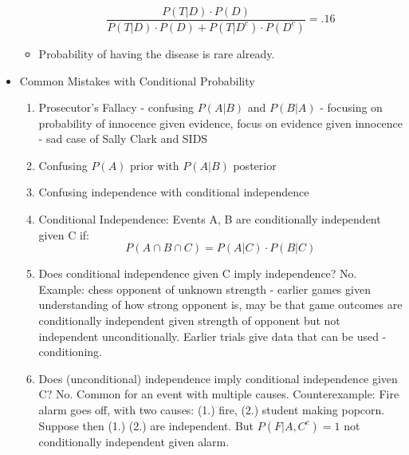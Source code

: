 \documentclass[11pt, oneside]{article}   	%
\begin{document}
\begin{itemize}
\begin{itemize}
						\[
							\frac{P(T|D) \cdot P(D)}{P(T|D) \cdot P(D) + P(T|D^{c}) \cdot P(D^{c})} = .16
						\]
					\item Probability of having the disease is rare already.
				\end{itemize}
			\item Common Mistakes with Conditional Probability
				\begin{enumerate}
					\item Prosecutor's Fallacy - confusing $P(A|B)$ and $P(B|A)$ - focusing on probability of innocence given evidence, focus on evidence given innocence - sad case of Sally Clark and SIDS
					\item Confusing $P(A)$ prior with $P(A|B)$ posterior
					\item Confusing independence with conditional independence
					\item Conditional Independence: Events A, B are conditionally independent given C if:
						\[
							P(A \cap B \cap C) = P(A|C) \cdot P(B|C)
						\]
					\item Does conditional independence given C imply independence? No. Example: chess opponent of unknown strength - earlier games given understanding of how strong opponent is, may be that game outcomes are conditionally independent
						given strength of opponent but not independent unconditionally. Earlier trials give data that can be used - conditioning.
					\item Does (unconditional) independence imply conditional independence given C? No. Common for an event with multiple causes. Counterexample: Fire alarm goes off, with two causes: (1.) fire, (2.) student making popcorn. Suppose then (1.) 
						(2.) are independent. But $P(F | A, C^{c}) = 1$ not conditionally independent given alarm.
				\end{enumerate}
		\end{itemize}
\end{document}
